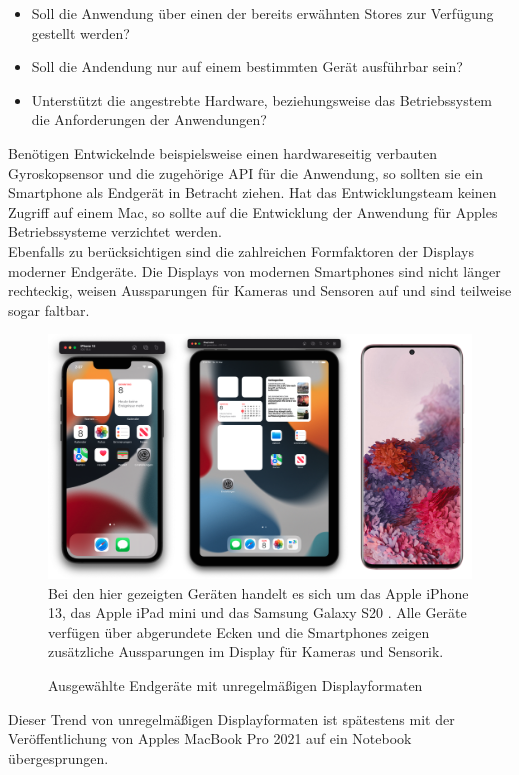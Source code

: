 \documentclass[a4paper]{scrartcl}
\begin{document}
\begin{itemize}
	\item Soll die Anwendung über einen der bereits erwähnten Stores zur Verfügung gestellt werden?
	\item Soll die Andendung nur auf einem bestimmten Gerät ausführbar sein?
	\item Unterstützt die angestrebte Hardware, beziehungsweise das Betriebssystem die Anforderungen der Anwendungen?
\end{itemize}

Benötigen Entwickelnde beispielsweise einen hardwareseitig verbauten Gyroskopsensor und die zugehörige API für die Anwendung, so sollten sie ein Smartphone als Endgerät in Betracht ziehen. Hat das Entwicklungsteam keinen Zugriff auf einem Mac, so sollte auf die Entwicklung der Anwendung für Apples Betriebssysteme verzichtet werden. \\
Ebenfalls zu berücksichtigen sind die zahlreichen Formfaktoren der Displays moderner Endgeräte. Die Displays von modernen Smartphones sind nicht länger rechteckig, weisen Aussparungen für Kameras und Sensoren auf und sind teilweise sogar faltbar.

\begin{figure}[H]
	\centering
	\caption{Ausgewählte Endgeräte mit unregelmäßigen Displayformaten}
	\includegraphics[scale=0.25]{_assets/phones_displays.png} \\
	Bei den hier gezeigten Geräten handelt es sich um das Apple iPhone 13, das Apple iPad mini und das Samsung Galaxy S20 \autocite{Galaxy_Picture}. Alle Geräte verfügen über abgerundete Ecken und die Smartphones zeigen zusätzliche Aussparungen im Display für Kameras und Sensorik.
\end{figure}

Dieser Trend von unregelmäßigen Displayformaten ist spätestens mit der Veröffentlichung von Apples MacBook Pro 2021 auf ein Notebook übergesprungen.
\end{document}
